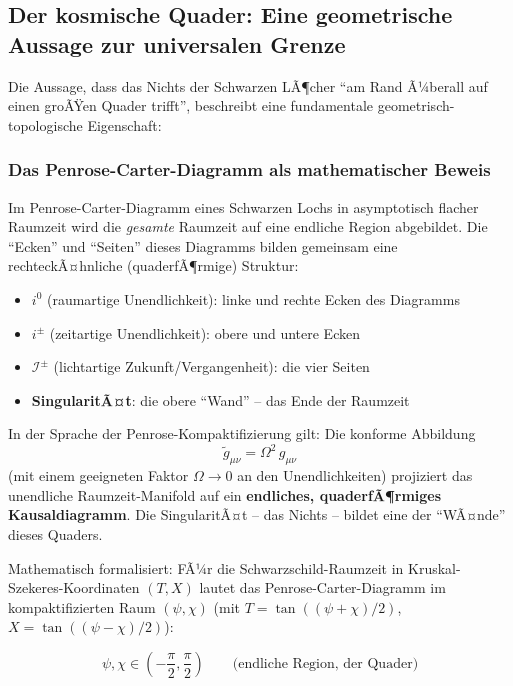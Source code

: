 ﻿\documentclass[12pt,a4paper]{report}
\begin{document}
\subsection{Der kosmische Quader: Eine geometrische Aussage zur universalen Grenze}

Die Aussage, dass das Nichts der Schwarzen LÃ¶cher "`am Rand Ã¼berall auf einen groÃŸen Quader trifft"', beschreibt eine fundamentale geometrisch-topologische Eigenschaft:

\subsubsection{Das Penrose-Carter-Diagramm als mathematischer Beweis}

Im Penrose-Carter-Diagramm eines Schwarzen Lochs in asymptotisch flacher Raumzeit wird die \emph{gesamte} Raumzeit auf eine endliche Region abgebildet. Die ``Ecken'' und ``Seiten'' dieses Diagramms bilden gemeinsam eine rechteckÃ¤hnliche (quaderfÃ¶rmige) Struktur:

\begin{itemize}
    \item \textbf{$i^0$} (raumartige Unendlichkeit): linke und rechte Ecken des Diagramms
    \item \textbf{$i^\pm$} (zeitartige Unendlichkeit): obere und untere Ecken
    \item \textbf{$\mathscr{I}^\pm$} (lichtartige Zukunft/Vergangenheit): die vier Seiten
    \item \textbf{SingularitÃ¤t}: die obere ``Wand'' -- das Ende der Raumzeit
\end{itemize}

In der Sprache der Penrose-Kompaktifizierung gilt: Die konforme Abbildung
\begin{equation}
    \tilde{g}_{\mu\nu} = \Omega^2\, g_{\mu\nu}
    \label{eq:konforme_abbildung}
\end{equation}
(mit einem geeigneten Faktor $\Omega \to 0$ an den Unendlichkeiten) projiziert das unendliche Raumzeit-Manifold auf ein \textbf{endliches, quaderfÃ¶rmiges Kausaldiagramm}. Die SingularitÃ¤t -- das Nichts -- bildet eine der ``WÃ¤nde'' dieses Quaders.

Mathematisch formalisiert: FÃ¼r die Schwarzschild-Raumzeit in Kruskal-Szekeres-Koor\-dinaten $(T, X)$ lautet das Penrose-Carter-Diagramm im kompaktifizierten Raum $(\psi, \chi)$ (mit $T = \tan((\psi+\chi)/2)$, $X = \tan((\psi-\chi)/2)$):

\begin{equation}
    \psi, \chi \in \left(-\frac{\pi}{2}, \frac{\pi}{2}\right) \qquad \text{(endliche Region, der Quader)}
    \label{eq:penrose_kompakt}
\end{equation}
\end{document}
